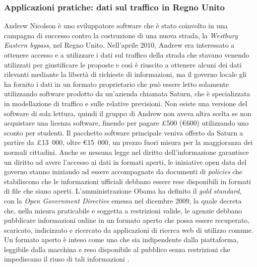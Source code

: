 

\subsubsection{Applicazioni pratiche: dati sul traffico in Regno Unito}
Andrew Nicolson è uno sviluppatore software che è stato coinvolto in una campagna di successo contro la costruzione di una nuova strada, la \textit{Westbury Eastern bypass}, nel Regno Unito. Nell'aprile 2010, Andrew era interessato a ottenere accesso e a utilizzare i dati sul traffico della strada che stavano venendo utilizzati per giustificare le proposte e così è riuscito a ottenere alcuni dei dati rilevanti mediante la libertà di richieste di informazioni, ma il governo locale gli ha fornito i dati in un formato proprietario che può essere letto solamente utilizzando software prodotto da un'azienda chiamata Saturn, che è specializzata in modellazione di traffico e sulle relative previsioni. Non esiste una versione del software di sola lettura, quindi il gruppo di Andrew non aveva altra scelta se non acquistare una licenza software, finendo per pagare £500 (€600) utilizzando uno sconto per studenti. Il pacchetto software principale veniva offerto da Saturn a partire da £13\ 000, oltre €15\ 000, un prezzo fuori misura per la maggioranza dei normali cittadini. Anche se nessuna legge nel diritto dell'informazione garantisce un diritto ad avere l'accesso ai dati in formati aperti, le iniziative open data del governo stanno iniziando ad essere accompagnate da documenti di \textit{policies} che stabiliscono che le informazioni ufficiali debbano essere rese disponibili in formati di file che siano aperti. L'amministrazione Obama ha definito il \textit{gold standard}, con la \textit{Open Government Directive} emessa nel dicembre 2009, la quale decreta che, nella misura praticabile e soggetta a restrizioni valide, le agenzie debbano pubblicare informazioni online in un formato aperto che possa essere recuperato, scaricato, indicizzato e ricercato da applicazioni di ricerca web di utilizzo comune. Un formato aperto è inteso come uno che sia indipendente dalla piattaforma, leggibile dalla macchina e reso disponibile al pubblico senza restrizioni che impediscano il riuso di tali informazioni \cite{OpenDataHandbook_FileFormats}.


